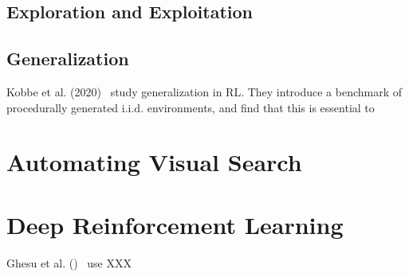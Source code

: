 \subsection{Exploration and Exploitation}

% 



\subsection{Generalization}




Kobbe et al. (2020)~\cite{} study generalization in RL. They introduce a benchmark of procedurally generated i.i.d. environments, and find that this is essential to 


\section{Automating Visual Search}



\section{Deep Reinforcement Learning}

Ghesu et al. ()~\cite{ghesu_multi-scale_2019} use XXX